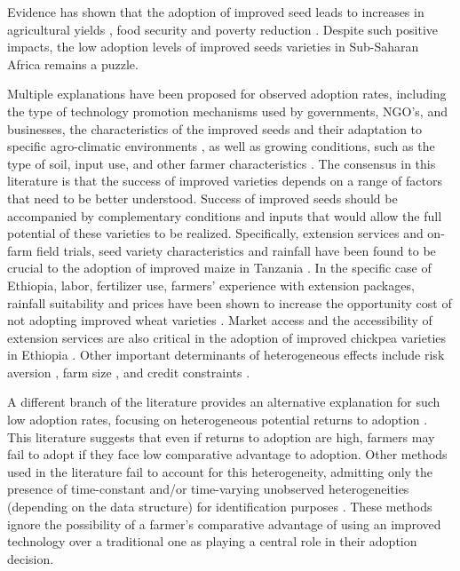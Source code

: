 \documentclass{article}
\begin{document}
Evidence has shown that the adoption of improved seed leads to increases in agricultural yields \citep{Carter2014-fm}, food security \citep{Shiferaw2014-op} and poverty reduction \citep{Minten2008-tj}. Despite such positive impacts, the low adoption levels of improved seeds varieties in Sub-Saharan Africa remains a puzzle. 


Multiple explanations have been proposed for observed adoption rates, including the type of technology promotion mechanisms used by governments, NGO’s, and businesses, the characteristics of the improved seeds and their adaptation to specific agro-climatic environments \citep{Bird2020-nt}, as well as growing conditions, such as the type of soil, input use, and other farmer characteristics \citep{Munshi2004-og}. The consensus in this literature is that the success of improved varieties depends on a range of factors that need to be better understood. Success of improved seeds should be accompanied by complementary conditions and inputs that would allow the full potential of these varieties to be realized. Specifically, extension services and on-farm field trials, seed variety characteristics and rainfall have been found to be crucial to the adoption of improved maize in Tanzania \citep{Kaliba2000-jh}. In the specific case of Ethiopia, labor, fertilizer use, farmers’ experience with extension packages, rainfall suitability and prices have been shown to increase the opportunity cost of not adopting improved wheat varieties \citep{Wale2006-bv}. Market access and the accessibility of extension services are also critical in the adoption of improved chickpea varieties in Ethiopia \citep{Verkaart2019-ol}. Other important determinants of heterogeneous effects include risk aversion \citep{Holden2016-vy}, farm size \citep{Ghimire2015-bd}, and credit constraints \citep{Simtowe2008-jn,Balana2020-hx}.



A different branch of the literature provides an alternative explanation for such low adoption rates, focusing on heterogeneous potential returns to adoption \citep{Suri2011-oi}. This literature suggests that even if returns to adoption are high, farmers may fail to adopt if they face low comparative advantage to adoption. Other methods used in the literature fail to account for this heterogeneity, admitting only the presence of time-constant and/or time-varying unobserved heterogeneities (depending on the data structure) for identification purposes \citep{Kassie2018-xn,Falco2011-rt}. These methods ignore the possibility of a farmer’s comparative advantage of using an improved technology over a traditional one as playing a central role in their adoption decision. 
\end{document}
